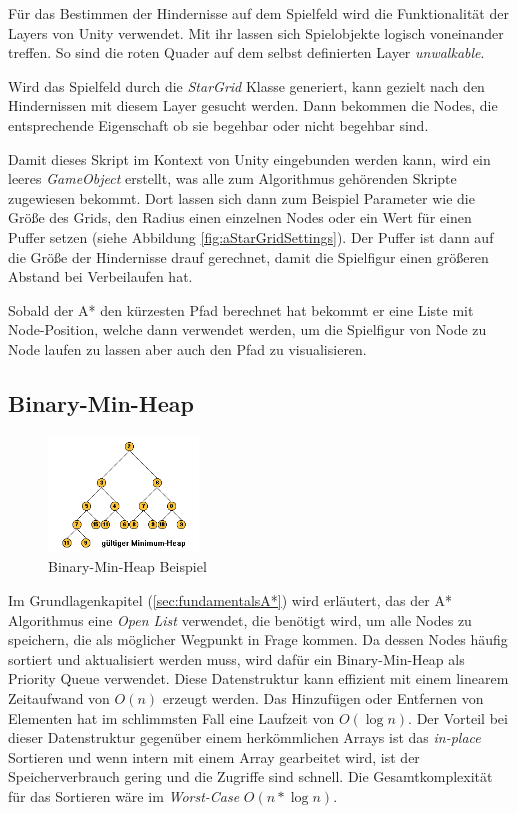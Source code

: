 Für das Bestimmen der Hindernisse auf dem Spielfeld wird die Funktionalität der Layers von Unity verwendet. Mit ihr lassen sich Spielobjekte logisch voneinander treffen. So sind die roten Quader auf dem selbst definierten Layer \textit{unwalkable}.

Wird das Spielfeld durch die \textit{StarGrid} Klasse generiert, kann gezielt nach den Hindernissen mit diesem Layer gesucht werden. Dann bekommen die Nodes, die entsprechende Eigenschaft ob sie begehbar oder nicht begehbar sind.

Damit dieses Skript im Kontext von Unity eingebunden werden kann, wird ein leeres \textit{GameObject} erstellt, was alle zum Algorithmus gehörenden Skripte zugewiesen bekommt. Dort lassen sich dann zum Beispiel Parameter wie die Größe des Grids, den Radius einen einzelnen Nodes oder ein Wert für einen Puffer setzen (siehe Abbildung \ref{fig:aStarGridSettings}). Der Puffer ist dann auf die Größe der Hindernisse drauf gerechnet, damit die Spielfigur einen größeren Abstand bei Verbeilaufen hat.

Sobald der A* den kürzesten Pfad berechnet hat bekommt er eine Liste mit Node-Position, welche dann verwendet werden, um die Spielfigur von Node zu Node laufen zu lassen aber auch den Pfad zu visualisieren. 

\subsection*{Binary-Min-Heap}
\begin{figure}
    \vspace{-\intextsep}
    \hspace*{-.75\columnsep}
    \includegraphics[width=4cm]{assets/heap_example.png}
    \caption{Binary-Min-Heap Beispiel}
    \label{fig:aStarHeap}
\end{figure}
Im Grundlagenkapitel  (\ref{sec:fundamentalsA*}) wird erläutert, das der A* Algorithmus eine \textit{Open List} verwendet, die benötigt wird, um alle Nodes zu speichern, die als möglicher Wegpunkt in Frage kommen. Da dessen Nodes häufig sortiert und aktualisiert werden muss, wird dafür ein Binary-Min-Heap als Priority Queue verwendet. Diese Datenstruktur kann effizient mit einem linearem Zeitaufwand von $O(n)$ erzeugt werden. Das Hinzufügen oder Entfernen von Elementen hat im schlimmsten Fall eine Laufzeit von $O(\log{n})$. Der Vorteil bei dieser Datenstruktur gegenüber einem herkömmlichen Arrays ist das \textit{in-place} Sortieren und wenn intern mit einem Array gearbeitet wird, ist der Speicherverbrauch gering und die Zugriffe sind schnell. Die Gesamtkomplexität für das Sortieren wäre im \textit{Worst-Case} $O(n*\log{n})$.

